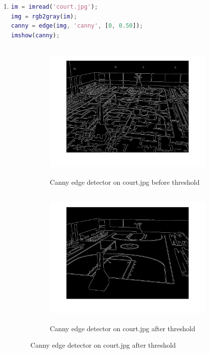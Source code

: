 \documentclass{csc_assignment4}
\begin{document}
\begin{description}
\begin{enumerate}[label=(\alph*)]
\begin{enumerate}[label=(\alph*)]
\begin{itemize}
\begin{itemize}
\end{itemize}
\end{itemize}
\newpage
\item 
\begin{lstlisting}[language=MATLAB]
im = imread('court.jpg');
img = rgb2gray(im);
canny = edge(img, 'canny', [0, 0.50]);
imshow(canny);
\end{lstlisting}
\begin{figure}[h]
\centering
\begin{subfigure}{0.5\textwidth}
\centering
\includegraphics[width=1.2\linewidth, height=7cm]{q4b2.jpg}
\vspace{-10mm}
\caption{Canny edge detector on court.jpg before threshold}
\end{subfigure}
\begin{subfigure}{0.5\textwidth}
\centering
\includegraphics[width=1.2\linewidth, height=7cm]{q4b.jpg}
\vspace{-10mm}
\caption{Canny edge detector on court.jpg after threshold}
\end{subfigure}
\end{figure}
\end{enumerate}
\end{enumerate}


\end{description}
\end{document}

